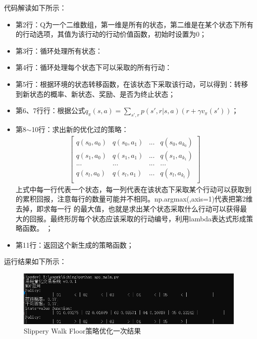 代码解读如下所示：
\begin{itemize}
    \item 第2行：Q为一个二维数组，第一维是所有的状态，第二维是在某个状态下所有的行动选项，其值为该行动的行动价值函数，初始时设置为0；
    \item 第3行：循环处理所有状态：
    \item 第4行：循环处理每个状态下可以采取的所有行动：
    \item 第5行：根据环境的状态转移函数，在该状态下采取该行动，可以得到：转移到新状态的概率、新状态、奖励、是否为终止状态；
    \item 第6、7行行：根据公式$q_{\pi}(s, a)=\sum_{s',r} p(s', r|s, a)(r+\gamma v_{\pi}(s'))$；
    \item 第8$\sim$10行：求出新的优化过的策略：
\begin{equation}
\begin{aligned}
    \begin{bmatrix}
        q(s_{0}, a_{0}) & q(s_{0}, a_{1}) & ... & q(s_{0}, a_{k_{0}}) \\
        q(s_{1}, a_{0}) & q(s_{1}, a_{1}) & ... & q(s_{1}, a_{k_{1}}) \\
        ... & ... & ... & ... \\
        q(s_{l}, a_{0}) & q(s_{l}, a_{1}) & ... & q(s_{l}, a_{k_{l}}) \\
    \end{bmatrix}
\end{aligned}
\label{chp001-policy-improvement1}
\end{equation}
上式中每一行代表一个状态，每一列代表在该状态下采取某个行动可以获取到的累积回报，注意每行的数量可能并不相同。np.argmax(,axis=1)代表把第2维去掉，即求每一行
的最大值，也就是求出某个状态采取什么行动可以获得最大的回报。最终形厉每个状态应该采取的行动编号，利用lambda表达式形成策略函数。
    ；
    \item 第11行：返回这个新生成的策略函数；
\end{itemize}
运行结果如下所示：
\begin{figure}[H]
	\caption{Slippery Walk Floor策略优化一次结果}
	\label{p000010}
	\centering
	\includegraphics[width=15cm]{images/p000010}
\end{figure}
